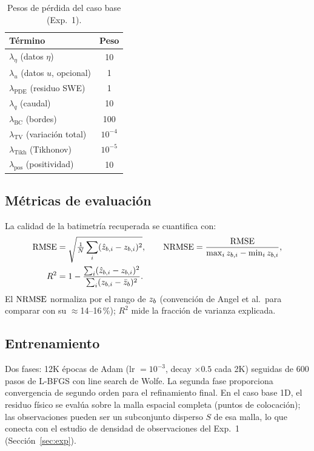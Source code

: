 \begin{table}[H]
\centering
\caption{Pesos de pérdida del caso base (Exp.~1).}
\label{tab:pesos}
\begin{tabular}{lc}
\toprule
Término & Peso \\
\midrule
$\lambda_{\eta}$ (datos $\eta$)         & 10 \\
$\lambda_{u}$ (datos $u$, opcional)     & 1 \\
$\lambda_{\text{PDE}}$ (residuo SWE)    & 1 \\
$\lambda_{q}$ (caudal)                  & 10 \\
$\lambda_{\text{BC}}$ (bordes)          & 100 \\
$\lambda_{\text{TV}}$ (variación total) & $10^{-4}$ \\
$\lambda_{\text{Tikh}}$ (Tikhonov)      & $10^{-5}$ \\
$\lambda_{\text{pos}}$ (positividad)    & 10 \\
\bottomrule
\end{tabular}
\end{table}

\subsection{Métricas de evaluación}

La calidad de la batimetría recuperada se cuantifica con:
\begin{align*}
  \mathrm{RMSE}  &= \sqrt{\tfrac{1}{N}\sum_i (\hat z_{b,i}-z_{b,i})^2}, \qquad
  \mathrm{NRMSE}  = \frac{\mathrm{RMSE}}{\max_i z_{b,i} - \min_i z_{b,i}}, \\
  R^2    &= 1 - \frac{\sum_i (\hat z_{b,i}-z_{b,i})^2}
                     {\sum_i (z_{b,i}-\bar z_b)^2}.
\end{align*}
El $\mathrm{NRMSE}$ normaliza por el rango de $z_b$ (convención de Angel et al.\, para
comparar con su $\approx$14--16\,\%); $R^2$ mide la fracción de varianza
explicada.

\subsection{Entrenamiento}

Dos fases: 12K épocas de Adam (lr $= 10^{-3}$, decay $\times 0.5$ cada 2K)
seguidas de 600 pasos de L-BFGS con line search de Wolfe. La segunda fase
proporciona convergencia de segundo orden para el refinamiento final. En el
caso base 1D, el residuo físico se evalúa sobre la malla espacial completa
(puntos de colocación); las observaciones pueden ser un subconjunto disperso
$S$ de esa malla, lo que conecta con el estudio de densidad de observaciones
del Exp.~1 (Sección~\ref{sec:exp}).

